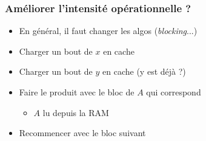 \documentclass[xcolor={x11names,svgnames}]{beamer}
\begin{document}

\begin{frame}[fragile, label=blocking]
  \frametitle{Améliorer l'intensité opérationnelle ?}

  \begin{itemize}
  \item En général, il faut changer les algos (\alert{\emph{blocking}}...)
  \end{itemize}

  \begin{center}
\end{center}

\begin{itemize}
\item Charger un bout de $x$ en cache
\item Charger un bout de $y$ en cache (y est déjà ?)
\item Faire le produit avec le bloc de $A$ qui correspond
  \begin{itemize}
  \item $A$ lu depuis la RAM
  \end{itemize}
\item Recommencer avec le bloc suivant
\end{itemize}
\end{frame}

              
\end{document}
